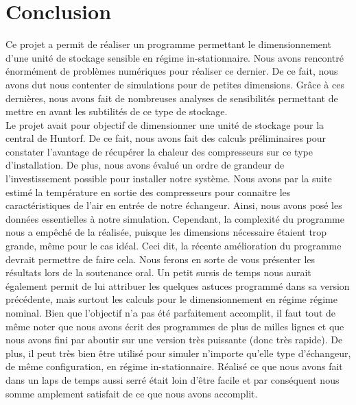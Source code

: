 
\chapter*{Conclusion}



Ce projet a permit de réaliser un programme permettant le dimensionnement d'une unité de stockage sensible en régime in-stationnaire. Nous avons rencontré énormément de problèmes numériques pour réaliser ce dernier. De ce fait, nous avons dut nous contenter de simulations pour de petites dimensions. Grâce à ces dernières, nous avons fait de nombreuses analyses de sensibilités permettant de mettre en avant les subtilités de ce type de stockage.\\

Le projet avait pour objectif de dimensionner une unité de stockage pour la central de Huntorf. De ce fait, nous avons fait des calculs préliminaires pour constater l'avantage de récupérer la chaleur des compresseurs sur ce type d'installation. De plus, nous avons évalué un ordre de grandeur de l'investissement possible pour installer notre système. Nous avons par la suite estimé la température en sortie des compresseurs pour connaitre les caractéristiques de l'air en entrée de notre échangeur. Ainsi, nous avons posé les données essentielles à notre simulation. Cependant, la complexité du programme nous a empêché de la réalisée, puisque les dimensions nécessaire étaient trop grande, même pour le cas idéal. Ceci dit, la récente amélioration du programme devrait permettre de faire cela. Nous ferons en sorte de vous présenter les résultats lors de la soutenance oral. Un petit sursis de temps nous aurait également permit de lui attribuer les quelques astuces programmé dans sa version précédente, mais surtout les calculs pour le dimensionnement en régime régime nominal. Bien que l'objectif n'a pas été parfaitement accomplit, il faut tout de même noter que nous avons écrit des programmes de plus de milles lignes et que nous avons fini par aboutir sur une version très puissante (donc très rapide). De plus, il peut très bien être utilisé pour simuler n'importe qu'elle type d'échangeur, de même configuration, en régime in-stationnaire. Réalisé ce que nous avons fait dans un laps de temps aussi serré était loin d'être facile et par conséquent nous somme amplement satisfait de ce que nous avons accomplit. 



